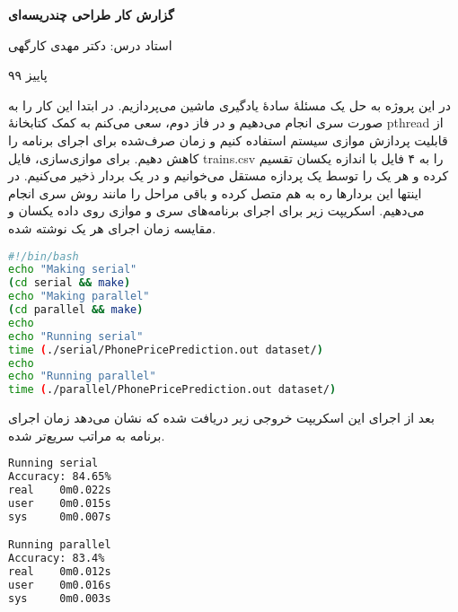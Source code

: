 \documentclass[openany,a4paper,12pt]{article}
\begin{document}
\begin{center}

\textbf{گزارش کار طراحی چندریسه‌ای}

استاد درس: دکتر مهدی کارگهی

پاییز ۹۹
\end{center}

در این پروژه به حل یک مسئلهٔ سادهٔ یادگیری ماشین می‌پردازیم. در ابتدا این کار را به صورت سری انجام می‌دهیم و در فاز دوم، سعی می‌کنم به کمک کتابخانهٔ pthread از قابلیت پردازش موازی سیستم استفاده کنیم و زمان صرف‌شده برای اجرای برنامه را کاهش دهیم.
برای موازی‌سازی، فایل trains.csv را به ۴ فایل با اندازه یکسان تقسیم کرده و هر یک را توسط یک پردازه مستقل می‌خوانیم و در یک بردار ذخیر می‌کنیم. در اینتها این بردارها ره به هم متصل کرده و باقی مراحل را مانند روش سری انجام می‌دهیم.
اسکریپت زیر برای اجرای برنامه‌های سری و موازی روی داده یکسان و مقایسه زمان اجرای هر یک نوشته شده.

\LTR
\begin{lstlisting}[language=bash]
#!/bin/bash
echo "Making serial"
(cd serial && make)
echo "Making parallel"
(cd parallel && make)
echo
echo "Running serial"
time (./serial/PhonePricePrediction.out dataset/)
echo
echo "Running parallel"
time (./parallel/PhonePricePrediction.out dataset/)
\end{lstlisting}
\RTL

بعد از اجرای این اسکریپت خروجی زیر دریافت شده که نشان می‌دهد زمان اجرای برنامه به مراتب سریع‌تر شده.

\LTR
\begin{lstlisting}[language=bash]
Running serial
Accuracy: 84.65%
real    0m0.022s
user    0m0.015s
sys     0m0.007s

Running parallel
Accuracy: 83.4%
real    0m0.012s
user    0m0.016s
sys     0m0.003s
\end{lstlisting}
\RTL
\end{document}
